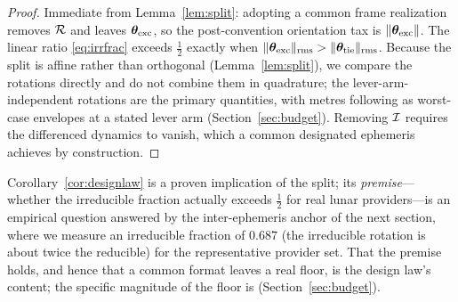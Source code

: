 \begin{proof}
Immediate from Lemma~\ref{lem:split}: adopting a common frame realization removes
$\mathcal{R}$ and leaves $\bm{\theta}_{\mathrm{exc}}$, so the post-convention orientation tax is
$\|\bm{\theta}_{\mathrm{exc}}\|$. The linear ratio \eqref{eq:irrfrac} exceeds $\tfrac12$
exactly when
$\|\bm{\theta}_{\mathrm{exc}}\|_{\mathrm{rms}}>\|\bm{\theta}_{\mathrm{tie}}\|_{\mathrm{rms}}$. Because
the split is affine rather than orthogonal (Lemma~\ref{lem:split}), we compare the
rotations directly and do not combine them in quadrature; the lever-arm-independent
rotations are the primary quantities, with metres following as worst-case envelopes at
a stated lever arm (Section~\ref{sec:budget}). Removing $\mathcal{I}$ requires the differenced
dynamics to vanish, which a common designated ephemeris achieves by construction.
\end{proof}

\noindent Corollary~\ref{cor:designlaw} is a proven implication of the split; its
\emph{premise}---whether the irreducible fraction actually exceeds $\tfrac12$ for real
lunar providers---is an empirical question answered by the inter-ephemeris anchor of
the next section, where we measure an irreducible fraction of $0.687$ (the irreducible
rotation is about twice the reducible) for the representative provider set. That the
premise holds, and hence that a common format leaves a real floor, is the design law's
content; the specific magnitude of the floor is \Modelled{} (Section~\ref{sec:budget}).
